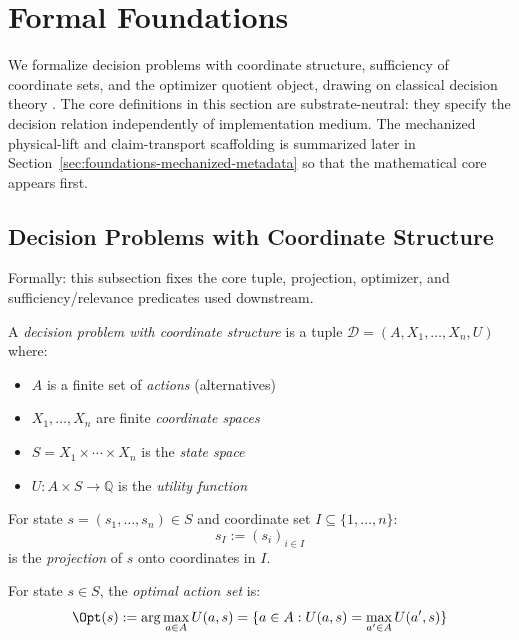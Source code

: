\section{Formal Foundations}\label{sec:foundations}

We formalize decision problems with coordinate structure, sufficiency of coordinate sets, and the optimizer quotient object, drawing on classical decision theory \cite{savage1954foundations, raiffa1961applied}.
The core definitions in this section are substrate-neutral: they specify the decision relation independently of implementation medium. The mechanized physical-lift and claim-transport scaffolding is summarized later in Section~\ref{sec:foundations-mechanized-metadata} so that the mathematical core appears first.

\subsection{Decision Problems with Coordinate Structure}

Formally: this subsection fixes the core tuple, projection, optimizer, and sufficiency/relevance predicates used downstream.

\begin{definition}\label{def:decision-problem}
A \emph{decision problem with coordinate structure} is a tuple $\mathcal{D} = (A, X_1, \ldots, X_n, U)$ where:
\begin{itemize}
\item $A$ is a finite set of \emph{actions} (alternatives)
\item $X_1, \ldots, X_n$ are finite \emph{coordinate spaces}
\item $S = X_1 \times \cdots \times X_n$ is the \emph{state space}
\item $U : A \times S \to \mathbb{Q}$ is the \emph{utility function}
\end{itemize}
\end{definition}

\begin{definition}[Projection]\label{def:projection}
For state $s = (s_1, \ldots, s_n) \in S$ and coordinate set $I \subseteq \{1, \ldots, n\}$:
\[
s_I := (s_i)_{i \in I}
\]
is the \emph{projection} of $s$ onto coordinates in $I$.
\end{definition}

\begin{definition}\label{def:optimizer}
For state $s \in S$, the \emph{optimal action set} is:
\[
\Opt(s) := \arg\max_{a \in A} U(a, s) = \{a \in A : U(a,s) = \max_{a' \in A} U(a', s)\}
\]
\end{definition}

